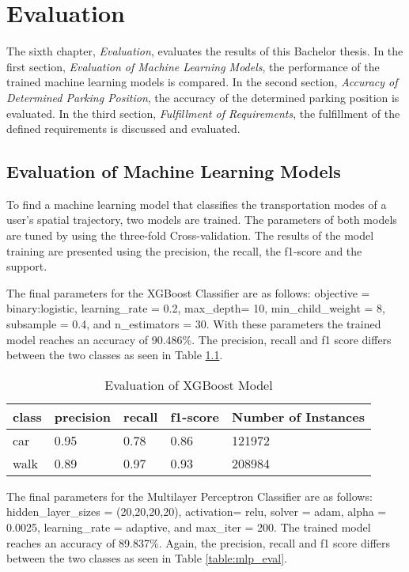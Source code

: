\chapter{Evaluation}
The sixth chapter, \textit{Evaluation}, evaluates the results of this Bachelor thesis. In the first section,  
\textit{Evaluation of Machine Learning Models}, the performance of the trained machine learning models is compared. In the second section, \textit{Accuracy of Determined Parking Position}, the accuracy of the determined parking position is evaluated. In the third section, \textit{Fulfillment of Requirements}, the fulfillment of the defined requirements is discussed and evaluated.

\section{Evaluation of Machine Learning Models}
To find a machine learning model that classifies the transportation modes of a user's spatial trajectory, two models are trained. The parameters of both models are tuned by using the three-fold Cross-validation. The results of the model training are presented using the precision, the recall, the f1-score and the support.

The final parameters for the XGBoost Classifier are as follows: \linebreak objective = binary:logistic, learning\_rate = 0.2, max\_depth= 10, min\_child\_weight = 8, subsample = 0.4, and n\_estimators = 30. With these parameters the trained model reaches an accuracy of 90.486\%. The precision, recall and f1 score differs 
between the two classes as seen in Table \ref{table:xgb_eval}. 

\begin{table}[h!]
    \centering
    \begin{tabular}{|l|l|l|l|l|} \toprule
        class & precision & recall & f1-score & Number of Instances \\ \midrule
        car & 0.95 & 0.78 & 0.86 & 121972 \\
        walk & 0.89 & 0.97 & 0.93 & 208984 \\ \bottomrule 
    \end{tabular}
    \caption{Evaluation of XGBoost Model}
    \label{table:xgb_eval}
\end{table}{}

The final parameters for the Multilayer Perceptron Classifier are as follows: \linebreak hidden\_layer\_sizes =  (20,20,20,20), activation= relu, solver = adam, alpha = 0.0025, learning\_rate = adaptive, and max\_iter = 200. The trained model reaches an accuracy of 89.837\%. Again, the  precision, recall and f1 score differs between the two classes as seen in Table \ref{table:mlp_eval}.


